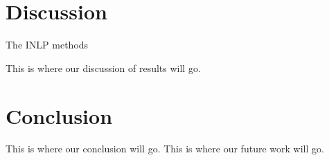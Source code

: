 \documentclass[11pt,a4paper]{article}
\begin{document}



\section{Discussion}
\label{sec:discussion}

The INLP methods 


This is where our discussion of results will go.



\section{Conclusion}
\label{sec:conclusion}


This is where our conclusion will go. This is where our future work will go. 











\end{document}

